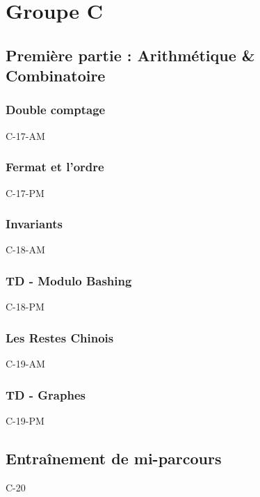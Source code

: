 \documentclass[poly,trombi]{valbonne}
\begin{document}
\chapter{Groupe C}

\minitoc \clearpage

\section{Première partie : Arithmétique \& Combinatoire}

\subsection{Double comptage}

{C-17-AM}

\subsection{Fermat et l'ordre}

{C-17-PM}

\subsection{Invariants}

{C-18-AM}

\subsection{TD - Modulo Bashing}

{C-18-PM}

\subsection{Les Restes Chinois}

{C-19-AM}

\subsection{TD - Graphes}

{C-19-PM}


\section{Entraînement de mi-parcours}

{C-20}
\end{document}
